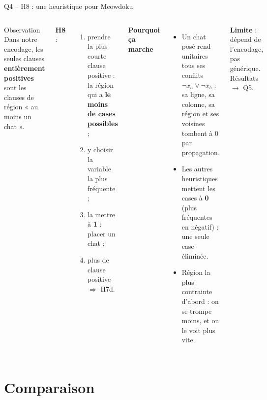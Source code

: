 \documentclass[aspectratio=169,11pt]{beamer}
\begin{document}
\begin{frame}{Q4 -- H8 : une heuristique pour Meowdoku}
  \begin{columns}[T]
    \begin{alertblock}{Observation}
      \small Dans notre encodage, les seules clauses \textbf{entièrement positives} sont les clauses de région « au moins un chat ».
    \end{alertblock}
    \textbf{H8} :
    \begin{enumerate}\small
      \item prendre la plus courte clause positive : la région qui a \textbf{le moins de cases possibles} ;
      \item y choisir la variable la plus fréquente ;
      \item la mettre à \textbf{1} : placer un chat ;
      \item plus de clause positive $\Rightarrow$ H7d.
    \end{enumerate}
    \textbf{Pourquoi ça marche}
    \begin{itemize}\small
      \item Un chat posé rend unitaires tous ses conflits $\neg x_a \lor \neg x_b$ : sa ligne, sa colonne, sa région et ses voisines tombent à 0 par propagation.
      \item Les autres heuristiques mettent les cases à \textbf{0} (plus fréquentes en négatif) : une seule case éliminée.
      \item Région la plus contrainte d'abord : on se trompe moins, et on le voit plus vite.
    \end{itemize}
    \smallskip
    {\footnotesize \textbf{Limite} : dépend de l'encodage, pas générique. Résultats $\to$ Q5.\par}
  \end{columns}
\end{frame}

\section{Comparaison}
\end{document}
